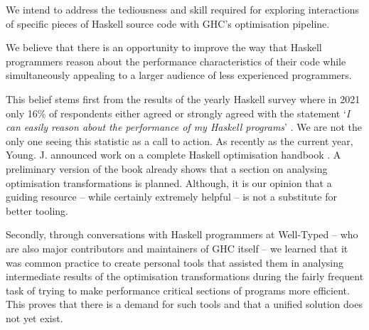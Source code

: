 We intend to address the tediousness and skill required for exploring interactions of specific 
pieces of Haskell source code with GHC's optimisation pipeline.

We believe that there is an opportunity to improve the way that Haskell programmers reason about
the performance characteristics of their code while simultaneously appealing to a larger audience
of less experienced programmers.

This belief stems first from the results of the yearly
Haskell survey where in 2021 only 16\% of respondents either agreed or strongly agreed with the
statement `\textit{I can easily reason about the performance of my Haskell programs}' \cite{haskell_survey_2021}.
We are not the only one seeing this statistic as a call to action. As recently as the current year,
Young. J. announced work on a complete Haskell optimisation handbook \cite{optimisation_handbook}.
A preliminary version of the book already shows that a section on analysing optimisation transformations
is planned. Although, it is our opinion that a guiding resource -- while certainly extremely helpful --
is not a substitute for better tooling.

Secondly, through conversations with Haskell programmers at Well-Typed -- who are also major contributors
and maintainers of GHC itself -- we learned that it was common practice to create personal tools that
assisted them in analysing intermediate results of the optimisation transformations during the fairly
frequent task of trying to make performance critical sections of programs more efficient. 
This proves that there is a demand for such tools and that a unified solution does not yet exist.

